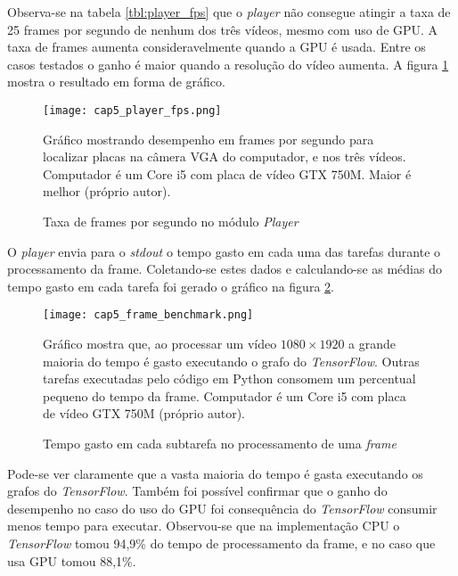 Observa-se na tabela \ref{tbl:player_fps} que o \emph{player} não consegue
atingir a taxa de 25 frames por segundo
de nenhum dos três vídeos, mesmo com uso de GPU. A taxa de frames
aumenta consideravelmente quando a GPU é usada. Entre os casos
testados o ganho é maior quando a resolução do vídeo aumenta. A figura
\ref{fig:cap5_player_fps} mostra o resultado em forma de gráfico.

\begin{figure}[!htb]
	\centering
	\texttt{[image: cap5\_player\_fps.png]}
	\caption{Taxa de frames por segundo no módulo \emph{Player}}
	\label{fig:cap5_player_fps}
	Gráfico mostrando desempenho em frames por segundo para localizar placas na
	câmera VGA do computador, e nos três vídeos. Computador é um Core i5 com
	placa de vídeo GTX 750M. Maior é melhor (próprio
	autor).
\end{figure}

O \emph{player} envia para o \emph{stdout} o tempo gasto em cada uma das
tarefas durante o processamento da frame. Coletando-se estes dados e
calculando-se as médias do tempo gasto em cada tarefa foi gerado o
gráfico na figura \ref{fig:cap5_frame_benchmark}.

\begin{figure}[!htb]
	\centering
	\texttt{[image: cap5\_frame\_benchmark.png]}
	\caption{Tempo gasto em cada subtarefa no processamento de uma
		\emph{frame}}
	\label{fig:cap5_frame_benchmark}
	Gráfico mostra que, ao processar um vídeo $1080 \times 1920$ a grande
	maioria do tempo é gasto executando o grafo do \emph{TensorFlow}. Outras
	tarefas executadas pelo código em Python consomem um percentual
	pequeno do tempo da frame. Computador é um Core i5 com
	placa de vídeo GTX 750M (próprio autor).
\end{figure}

Pode-se ver claramente que a vasta maioria do tempo é gasta executando os
grafos do \emph{TensorFlow}. Também foi possível confirmar que o ganho do
desempenho no caso do uso do GPU foi consequência do \emph{TensorFlow}
consumir menos tempo para executar. Observou-se que na implementação CPU
o \emph{TensorFlow} tomou 94,9\% do tempo de processamento da frame, e no
caso que usa GPU tomou 88,1\%.
